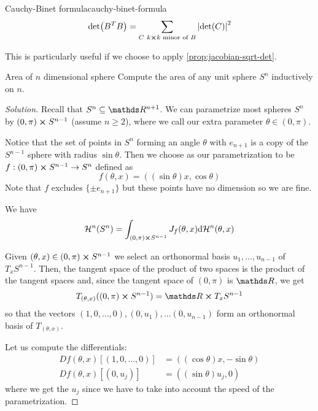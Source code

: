 \documentclass[12pt]{extarticle}
\begin{document}
\begin{remark}{Cauchy-Binet formula}{cauchy-binet-formula}
	\begin{equation}
		\det(B^T B) = \sum_{C \ k\cross k \text{ minor of } B} \abs{\det (C)}^2
	\end{equation}
\end{remark}
This is particularly useful if we choose to apply \cref{prop:jacobian-sqrt-det}.

\begin{example}{Area of $n$ dimensional sphere}{}
	Compute the area of any unit sphere $S^n$ inductively on $n$.
\end{example}
\begin{proof}[Solution]
	Recall that $S^n \subseteq \R^{n+1}$.
	We can parametrize most spheres $S^n$ by $(0, \pi)\cross S^{n-1}$
	(assume $n \geq 2$), where we call our extra parameter $\theta \in (0, \pi)$.

	Notice that the set of points in $S^n$ forming an angle $\theta$ with $e_{n+1}$ is a copy of the
	$S^{n-1}$ sphere with radius $\sin \theta$.
	Then we choose as our parametrization to be $f: (0, \pi) \cross S^{n-1} \to S^n$ defined as
	\begin{equation}
		f(\theta, x) = ((\sin \theta) x, \cos \theta)
	\end{equation}
	Note that $f$ excludes $\{\pm e_{n+1}\}$ but these points have no dimension so we are fine.

	We have
	\begin{equation}
		\mathcal H^n(S^n) = \int_{(0, \pi) \cross S^{n-1}} J_f(\theta, x) \dd \mathcal H^n (\theta, x)
	\end{equation}

	Given $(\theta, x) \in (0, \pi) \cross S^{n-1}$ we select an orthonormal basis
	$u_1, \dots, u_{n-1}$ of $T_x S^{n-1}$. Then, the tangent space of the product of two spaces is
	the product of the tangent spaces and, since the tangent space of $(0, \pi)$ is $\R$, we get
	\begin{equation}
		T_{(\theta, x)}((0, \pi) \cross S^{n-1}) = \R \cross T_x S^{n-1}
	\end{equation}
	so that the vectors $(1, 0, \dots, 0), (0, u_1), \dots (0, u_{n-1})$ form an orthonormal basis
	of $T_{(\theta, x)}$.

	Let us compute the differentials:
	\begin{align}
		Df(\theta, x)[(1, 0, \dots, 0)] & = ((\cos \theta) x, -\sin \theta) \\
		Df(\theta, x)[(0, u_j)]         & = ((\sin\theta) u_j, 0)
	\end{align}
	where we get the $u_j$ since we have to take into account the speed of the parametrization.


\end{proof}
\end{document}
